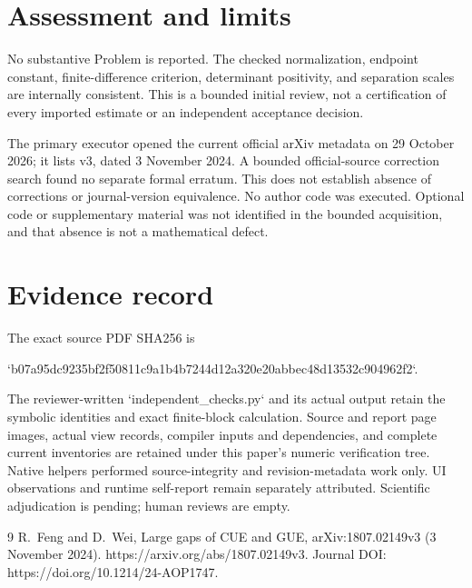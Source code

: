 \documentclass[10pt]{article}
\begin{document}
\section*{Assessment and limits}
No substantive Problem is reported. The checked normalization, endpoint constant, finite-difference criterion, determinant positivity, and separation scales are internally consistent. This is a bounded initial review, not a certification of every imported estimate or an independent acceptance decision.\par
The primary executor opened the current official arXiv metadata on 29 October 2026; it lists v3, dated 3 November 2024. A bounded official-source correction search found no separate formal erratum. This does not establish absence of corrections or journal-version equivalence. No author code was executed. Optional code or supplementary material was not identified in the bounded acquisition, and that absence is not a mathematical defect.\par
\section*{Evidence record}
The exact source PDF SHA256 is\par
`b07a95dc9235bf2f50811c9a1b4b7244d12a320e20abbec48d13532c904962f2`.\par
The reviewer-written `independent\_checks.py` and its actual output retain the symbolic identities and exact finite-block calculation. Source and report page images, actual view records, compiler inputs and dependencies, and complete current inventories are retained under this paper’s numeric verification tree. Native helpers performed source-integrity and revision-metadata work only. UI observations and runtime self-report remain separately attributed. Scientific adjudication is pending; human reviews are empty.\par
9 R. Feng and D. Wei, Large gaps of CUE and GUE, arXiv:1807.02149v3 (3 November 2024). https://arxiv.org/abs/1807.02149v3. Journal DOI: https://doi.org/10.1214/24-AOP1747.\par
\end{document}
